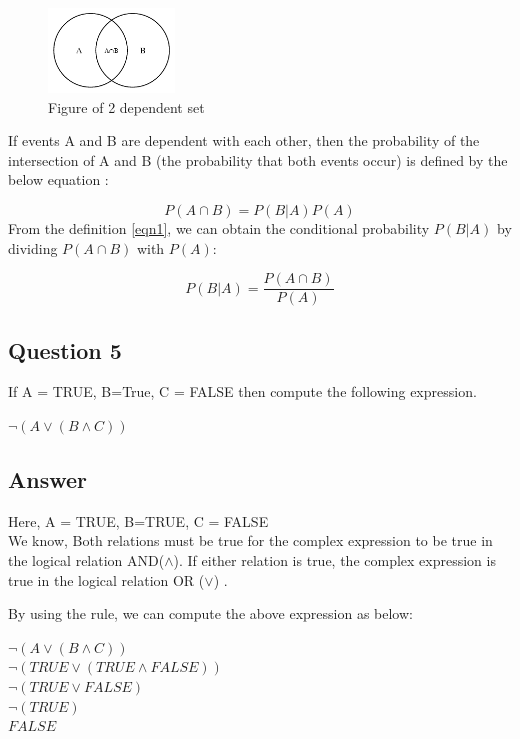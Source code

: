 \documentclass[12]{article}
\begin{document}
\begin{figure}[h]
\centering
\includegraphics[width=0.3\textwidth]{venntwo.png}
\caption{Figure of 2 dependent set \cite{1}}
\end{figure}

If events A and B are dependent with each other, then the probability of the intersection of A and B (the probability that both events occur) is defined by the below equation \cite{2}:

\begin{equation}
P(A \cap B)=P(B|A)P(A) 
\label{eqn1}
\end{equation}
From the definition \ref{eqn1}, we can obtain the conditional probability $P(B|A)$  by dividing $P(A \cap B)$ with $P(A)$:

\begin{equation}
P(B|A)=\frac{P(A \cap B)}{P(A)}
\label{eqn2}
\end{equation}
 

\subsection*{Question 5}
 If A = TRUE, B=True, C = FALSE then compute the following expression.\\
\begin{center}
   $\neg ( A \vee (B \land C) ) $ 
\end{center} 
\subsection*{Answer}
Here, A = TRUE, B=TRUE, C = FALSE \\
We know, Both relations must be true for the complex expression to be true in the logical relation AND($\land$).
If either relation is true, the complex expression is true in the logical relation OR ($\vee$) \cite{3}.

By using the rule, we can compute the above expression as below:\\
\begin{center}
$\neg ( A \vee (B \land C) ) $ \\
\implies $\neg ( TRUE \vee (TRUE \land FALSE )) $ \\
     \implies $\neg (TRUE \vee  FALSE)  $ \\
     \implies$\neg (TRUE)  $ \\
     \implies $FALSE$
      
     
\end{center}
\end{document}
